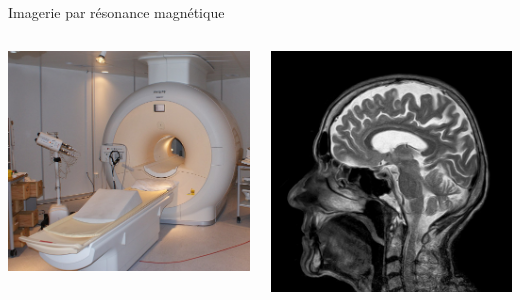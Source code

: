 \documentclass{beamer}
\begin{document}
\begin{frame}[t]{Imagerie par résonance magnétique}
  \begin{columns}

    \begin{center}
      \includegraphics[width=\textwidth]{figures/MRI-Philips.jpg}
    \end{center}


    \begin{center}
      \includegraphics[width=\textwidth]{figures/mri-brain.jpg}
    \end{center}
  \end{columns}
\end{frame}
\end{document}

